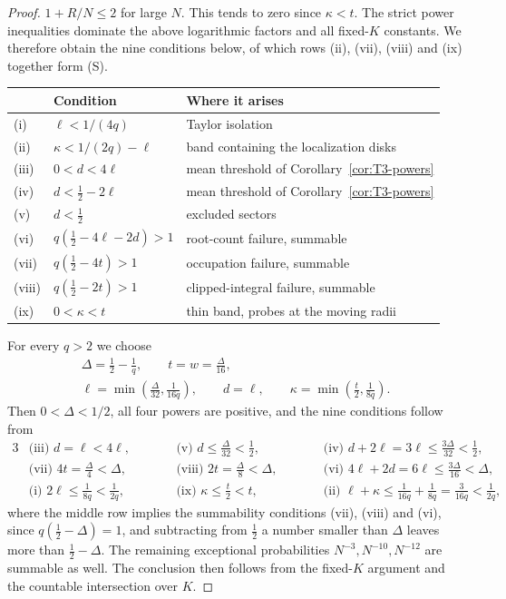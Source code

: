 \begin{proof}
$1+R/N\le2$ for large $N$.
This tends to zero since $\kappa<t$.
The strict power inequalities dominate the above logarithmic factors and
all fixed-$K$ constants.
We therefore obtain the nine conditions below, of which rows (ii), (vii),
(viii) and (ix) together form (S).
\begin{center}
\begin{tabular}{@{}lll@{}}
\toprule
 & Condition & Where it arises\\
\midrule
(i) & $\ell<1/(4q)$ & Taylor isolation\\
(ii) & $\kappa<1/(2q)-\ell$ & band containing the localization disks\\
(iii) & $0<d<4\ell$ & mean threshold of Corollary~\ref{cor:T3-powers}\\
(iv) & $d<\frac12-2\ell$ & mean threshold of Corollary~\ref{cor:T3-powers}\\
(v) & $d<\frac12$ & excluded sectors\\
(vi) & $q(\frac12-4\ell-2d)>1$ & root-count failure, summable\\
(vii) & $q(\frac12-4t)>1$ & occupation failure, summable\\
(viii) & $q(\frac12-2t)>1$ & clipped-integral failure, summable\\
(ix) & $0<\kappa<t$ & thin band, probes at the moving radii\\
\bottomrule
\end{tabular}
\end{center}

For every $q>2$ we choose
\begin{gather*}
 \Delta=\frac12-\frac1q,\qquad t=w=\frac\Delta{16},\\
 \ell=\min\left(\frac\Delta{32},\frac1{16q}\right),\qquad
 d=\ell,\qquad
 \kappa=\min\left(\frac t2,\frac1{8q}\right).
\end{gather*}
Then $0<\Delta<1/2$, all four powers are positive, and the nine
conditions follow from
\begin{alignat*}{3}
 &\text{(iii) }d=\ell<4\ell, &\qquad
 &\text{(v) }d\le\frac\Delta{32}<\frac12, &\qquad
 &\text{(iv) }d+2\ell=3\ell\le\frac{3\Delta}{32}<\frac12,\\
 &\text{(vii) }4t=\frac\Delta4<\Delta, &&
 \text{(viii) }2t=\frac\Delta8<\Delta, &&
 \text{(vi) }4\ell+2d=6\ell\le\frac{3\Delta}{16}<\Delta,\\
 &\text{(i) }2\ell\le\frac1{8q}<\frac1{2q}, &&
 \text{(ix) }\kappa\le\frac t2<t, &&
 \text{(ii) }\ell+\kappa\le\frac1{16q}+\frac1{8q}=\frac3{16q}<\frac1{2q},
\end{alignat*}
where the middle row implies the summability conditions (vii), (viii) and
(vi), since $q(\frac12-\Delta)=1$, and subtracting from $\frac12$ a
number smaller than $\Delta$ leaves more than $\frac12-\Delta$.
The remaining exceptional probabilities $N^{-3},N^{-10},N^{-12}$ are
summable as well. The conclusion then follows from the fixed-$K$
argument and the countable intersection over $K$.


\end{proof}
